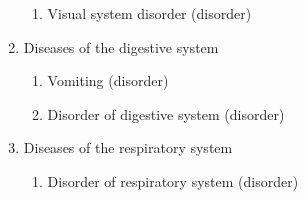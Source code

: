 \documentclass{article}[11pt,oneside]
\begin{document}
\begin{multicols}{2}
\begin{enumerate}
\begin{enumerate}
 \item Visual system disorder (disorder) %
 \end{enumerate} 
\item Diseases of the digestive system 
 \begin{enumerate} 
 \item Vomiting (disorder) %
 \item Disorder of digestive system (disorder)  %
 \end{enumerate} 
\item Diseases of the respiratory system 
 \begin{enumerate} 
 \item Disorder of respiratory system (disorder) %
 \end{enumerate} 
\end{enumerate}
\end{multicols}


\end{document}

